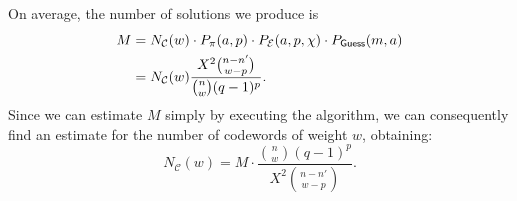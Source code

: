On average, the number of solutions we produce is
\begin{align}
M &\nonumber = N_{\mathcal{C}}(w) \cdot P_\pi(a,p)\cdot P_{\mathcal E}(a,p,\chi)\cdot P_{\sf{Guess}}(m,a)\\\nonumber
& = N_{\mathcal{C}}(w) \frac{X^{2}\binom{n-n'}{w-p}}{\binom{n}{w}(q-1)^p}.
\end{align}
Since we can estimate $M$ simply by executing the algorithm, we can consequently find an estimate for the number of codewords of weight $w$, obtaining:
\begin{equation}
    N_{\mathcal{C}}(w) = M \cdot \frac{\binom{n}{w}(q-1)^p}{X^{2}\binom{n-n'}{w-p}}.
\end{equation}
